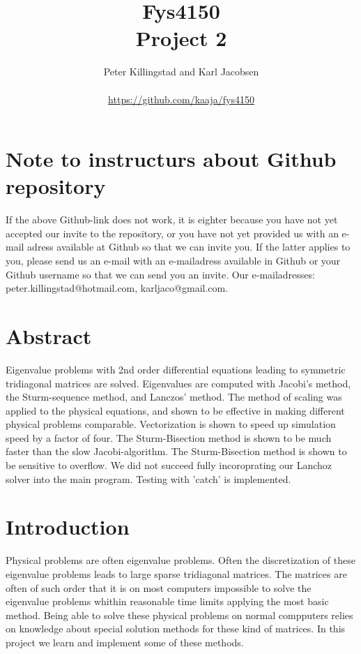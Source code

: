 \documentclass{article}
\title{Fys4150\\Project 2\\ }
\author{Peter Killingstad and Karl Jacobsen\\
\\
\url{https://github.com/kaaja/fys4150}}
\begin{document}
	
\maketitle

\section*{Note to instructurs about Github repository}
If the above Github-link does not work, it is eighter because you have not yet accepted our invite to the repository, or you have not yet provided us with an e-mail adress available at Github so that we can invite you. If the latter applies to you, please send us an e-mail with an e-mailadress available in Github or your Github username so that we can send you an invite. Our e-mailadresses: peter.killingstad@hotmail.com, karljaco@gmail.com.

\section*{Abstract}
Eigenvalue problems with 2nd order differential equations leading to symmetric tridiagonal matrices are solved. Eigenvalues are computed with Jacobi's method, the Sturm-sequence method, and Lanczos' method. The method of scaling was applied to the physical equations, and shown to be effective in making different physical problems comparable.  Vectorization is shown to speed up simulation speed by a factor of four. The Sturm-Bisection method is shown to be much faster than the slow Jacobi-algorithm. The Sturm-Bisection method is shown to be sensitive to overflow. We did not succeed fully incoroprating our Lanchoz solver into the main program. Testing with 'catch' is implemented.

\section{Introduction}
Physical problems are often eigenvalue problems. Often the discretization of these eigenvalue problems leads to large sparse tridiagonal matrices. The matrices are often of such order that it is on most computers impossible to solve the eigenvalue problems whithin reasonable time limits applying the most basic method. Being able to solve these physical problems on normal compputers relies on knowledge about special solution methods for these kind of matrices. In this project we learn and implement some of these methods.\\
\end{document}
